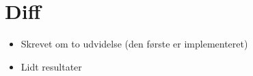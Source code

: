 {
\section*{Diff}
\begin{itemize}
    \item Skrevet om to udvidelse (den første er implementeret)
    \item Lidt resultater
\end{itemize}
}

